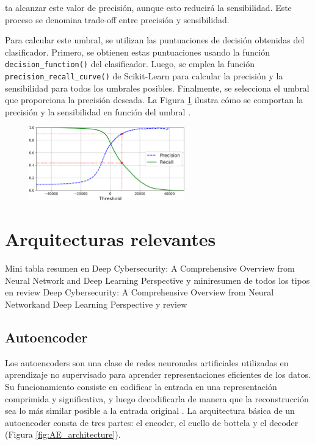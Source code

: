 ta alcanzar este valor de precisión, aunque esto reducirá la sensibilidad. Este proceso se denomina trade-off entre precisión y sensibilidad.

Para calcular este umbral, se utilizan las puntuaciones de decisión obtenidas del clasificador. Primero, se obtienen estas puntuaciones usando la función \lstinline|decision_function()| del clasificador. Luego, se emplea la función \lstinline|precision_recall_curve()| de Scikit-Learn para calcular la precisión y la sensibilidad para todos los umbrales posibles. Finalmente, se selecciona el umbral que proporciona la precisión deseada. La Figura \ref{img: pr_vs_threshold} ilustra cómo se comportan la precisión y la sensibilidad en función del umbral \citep{geron2022hands}.

\begin{figure}[h]
	\centering
    \includegraphics[width=0.6\textwidth]{img/precision_recall_vs_threshold.png}
    \label{img: pr_vs_threshold}
\end{figure}











\section{Arquitecturas relevantes} \label{Subsec: 3_2}
Mini tabla resumen en Deep Cybersecurity: A Comprehensive Overview from Neural Network and Deep Learning Perspective y miniresumen de todos los tipos en review Deep Cybersecurity: A Comprehensive Overview from Neural Networkand Deep Learning Perspective y review

\subsection{Autoencoder}

Los autoencoders son una clase de redes neuronales artificiales utilizadas en aprendizaje no supervisado para aprender representaciones eficientes de los datos. Su funcionamiento consiste en codificar la entrada en una representación comprimida y significativa, y luego decodificarla de manera que la reconstrucción sea lo más similar posible a la entrada original \citep{lopes2022effective}. La arquitectura básica de un autoencoder consta de tres partes: el encoder, el cuello de bottela y el decoder (Figura \ref{fig:AE_architecture}). 

